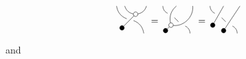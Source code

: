 \documentclass{article}
\begin{document}
\begin{equation}
\begin{gathered}
\begin{tikzpicture}[whit/.style={draw,regular polygon,
	regular polygon sides=4,fill=white}]
\node (0) at (0,0) {};
\node [scale=0.5, draw, circle, fill=black] (1) at (-0.3,-0.3) {};
\node [scale=0.5, draw, circle, fill=white] (2) at (0.2,0.2) {};
\draw (1)--(2);
\draw [bend right] (2) to (0.6,0.5);
\draw [bend left] (2) to (-0.2,0.5);
\draw [bend right] (0.5, -0.5) to (0);
\draw [bend left] (0) to (-0.5,0.5);
\end{tikzpicture}
\end{gathered}
\, = \,
\begin{gathered}
\begin{tikzpicture}[whit/.style={draw,regular polygon,
	regular polygon sides=4,fill=white}]
\node (0) at (-0.2,0.2) {};
\node (3) at (0.2, -0.2) {};
\node [scale=0.5, draw, circle, fill=black] (1) at (-0.4,-0.4) {};
\node [scale=0.5, draw, circle, fill=white] (2) at (-0.2,-0.2) {};
\draw (1)--(2);
\draw [bend right=50] (2) to (0.6,0.5);
\draw [bend left] (2) to (0,0.5);
\draw [bend right] (0.5, -0.5) to (3);
\draw (3)--(0);
\draw [bend left] (0) to (-0.5,0.5);
\end{tikzpicture}
\end{gathered}
\, = \,	
\begin{gathered}
\begin{tikzpicture}[whit/.style={draw,regular polygon,
	regular polygon sides=4,fill=white}]
\node (0) at (-0.2,0.2) {};
\node (3) at (0.2, -0.2) {};
\node [scale=0.5, draw, circle, fill=black] (1) at (-0.4,-0.2) {};
\node [scale=0.5, draw, circle, fill=black] (2) at (0,-0.4) {};
\draw (2) to (0.6,0.5);
\draw (1) to (0,0.5);
\draw [bend right] (0.5, -0.5) to (3);
\draw (3)--(0);
\draw [bend left] (0) to (-0.5,0.5);
\end{tikzpicture}
\end{gathered}	
\end{equation}
and
\end{document}
